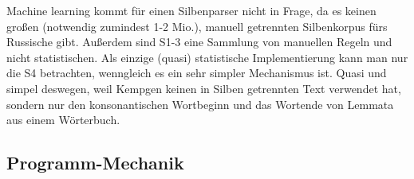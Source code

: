 \documentclass[12pt,headsepline,a4paper]{scrartcl}
\begin{document}
Machine learning kommt für einen Silbenparser nicht in Frage, da es keinen großen (notwendig zumindest 1-2 Mio.), manuell getrennten Silbenkorpus fürs Russische gibt. Außerdem sind S1-3 eine Sammlung von manuellen Regeln und nicht statistischen. Als einzige (quasi) statistische Implementierung kann man nur die S4 betrachten, wenngleich es ein sehr simpler Mechanismus ist. Quasi und simpel deswegen, weil Kempgen keinen in Silben getrennten Text verwendet hat, sondern nur den konsonantischen Wortbeginn und das Wortende von Lemmata aus einem Wörterbuch.


\subsection{Programm-Mechanik}
\end{document}
